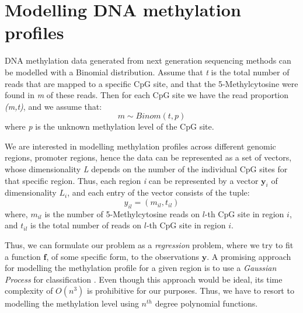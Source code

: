 \section{Modelling DNA methylation profiles} \label{model-meth-profiles-s}

DNA methylation data generated from next generation sequencing methods can be modelled with a Binomial distribution. Assume that \emph{t} is the total number of reads that are mapped to a specific CpG site, and that the 5-Methylcytosine were found in \emph{m} of these reads. Then for each CpG site we have the read proportion \emph{(m,t)}, and we assume that:
\begin{equation} \label{binom-1d-f}
	m \sim Binom(t, p)
\end{equation}
where \emph{p} is the unknown methylation level of the CpG site.

We are interested in modelling methylation profiles across different genomic regions, \eg promoter regions, hence the data can be represented as a set of vectors, whose dimensionality \emph{L} depends on the number of the individual CpG sites for that specific region. Thus, each region \emph{i} can be represented by a vector $\mathbf{y}_{i}$ of dimensionality $L_{i}$, and each entry of the vector consists of the tuple:
\begin{equation}
	y_{il} = (m_{il},t_{il})
\end{equation}
where, $m_{il}$ is the number of 5-Methylcytosine reads on $l$-th CpG site in region $i$, and $t_{il}$ is the total number of reads on $l$-th CpG site in region $i$. 

Thus, we can formulate our problem as a \emph{regression} problem, where we try to fit a function $\mathbf{f}$, of some specific form, to the observations $\mathbf{y}$. A promising approach for modelling the methylation profile for a given region is to use a \emph{Gaussian Process} for classification \citep{Rasmussen2006}. Even though this approach would be ideal, its time complexity of $O(n^{3})$ is prohibitive for our purposes. Thus, we have to resort to modelling the methylation level using $n^{th}$ degree polynomial functions.

